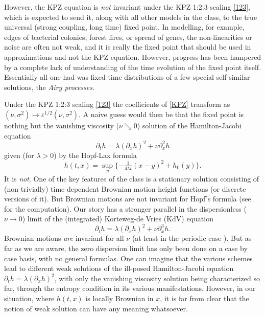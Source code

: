 \documentclass[letterpaper,reqno,11pt,oneside,final]{amsart}
\theoremstyle{definition}
\newcommand{\ep}{\varepsilon}
\numberwithin{equation}{section}
\begin{document}
However, the KPZ equation is \emph{not} invariant under the KPZ 1:2:3 scaling \eqref{123}, which is expected to send it, along
with all other models in the class, to the true universal (strong coupling, long time) fixed point.  
In modelling, for example, edges of bacterial colonies, forest fires, or spread of genes, the non-linearities or noise are often not weak, and it is really the fixed point that should be used in approximations and not the KPZ equation.
However, progress has been hampered by a complete lack of understanding of the time evolution of the fixed point itself.   
Essentially all one had was fixed time distributions of a few special self-similar solutions, the \emph{Airy processes}.

Under the KPZ 1:2:3 scaling \eqref{123} the coefficients of \eqref{KPZ} transform as $(\nu,\sigma^2)\mapsto \ep^{1/2}(\nu,\sigma^2)$.  
A naive guess would then be that the fixed point is nothing but the vanishing viscosity ($\nu\searrow 0$) solution of the Hamilton-Jacobi equation 
\begin{equation}
\partial_t h = \lambda(\partial_xh)^2    + \nu \partial_x^2h 
\end{equation} given (for $\lambda>0$) by the Hopf-Lax formula
\begin{equation}\label{eq:invbur}
h(t,x) = \sup_y\{ -\tfrac1{4\lambda t}(x-y)^2 + h_0(y)\}.
\end{equation}
It is \emph{not}. One of the key features of the class is a stationary solution consisting of (non-trivially) time dependent Brownian motion height functions (or discrete versions of it).
But Brownian motions are not invariant for Hopf's formula (see \cite{frachebourgMartin} for the computation).
Our story has a stronger parallel in the dispersionless ($\nu\to 0$) limit of the (integrated) Korteweg-de Vries (KdV) equation
\begin{equation}\label{}
\partial_t h = \lambda(\partial_xh)^2    + \nu \partial_x^3h. 
\end{equation}
Brownian motions \emph{are} invariant for all $\nu$ (at least in the periodic case \cite{QV}).
But as far as we are aware, the zero dispersion limit has only been done on a case by case basis, with no general formulas.
One can imagine that the various schemes lead to different weak solutions of the ill-posed Hamilton-Jacobi equation $\partial_t h = \lambda(\partial_xh)^2$, with only the vanishing viscosity solution being characterized so far, through the entropy condition in its various manifestations.
However, in our situation, where $h(t,x)$ is locally Brownian in $x$, it is far from clear that the notion of weak solution can have any meaning whatsoever.
\end{document}
